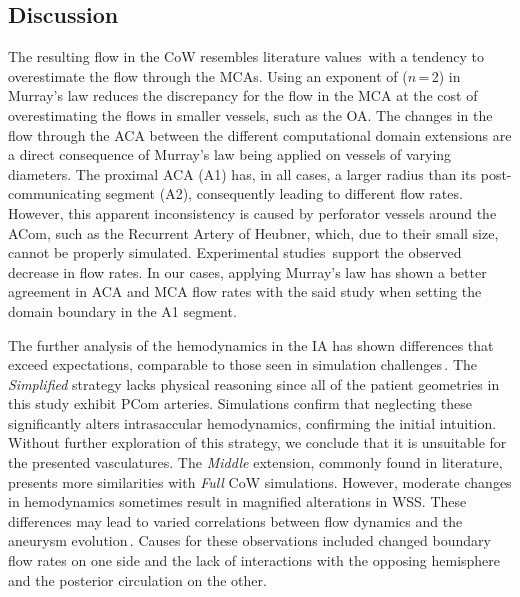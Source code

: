 \subsection{Discussion}
The resulting flow in the CoW resembles literature values\,\cite{Zarrinkoob2015} with a tendency to overestimate the flow through the MCAs. Using an exponent of ($n$\,=\,2) in Murray's law reduces the discrepancy for the flow in the MCA at the cost of overestimating the flows in smaller vessels, such as the OA. The changes in the flow through the ACA between the different computational domain extensions are a direct consequence of Murray's law being applied on vessels of varying diameters. The proximal ACA (A1) has, in all cases, a larger radius than its post-communicating segment (A2), consequently leading to different flow rates. However, this apparent inconsistency is caused by perforator vessels around the ACom, such as the Recurrent Artery of Heubner, which, due to their small size, cannot be properly simulated. Experimental studies\,\cite{Zarrinkoob2015} support the observed decrease in flow rates. In our cases, applying Murray's law has shown a better agreement in ACA and MCA flow rates with the said study when setting the domain boundary in the A1 segment.

The further analysis of the hemodynamics in the IA has shown differences that exceed expectations, comparable to those seen in simulation challenges\,\cite{Berg2018, Berg2019, Valen-Sendstad2018}. The \textit{Simplified} strategy lacks physical reasoning since all of the patient geometries in this study exhibit PCom arteries. Simulations confirm that neglecting these significantly alters intrasaccular hemodynamics, confirming the initial intuition. Without further exploration of this strategy, we conclude that it is unsuitable for the presented vasculatures. The \textit{Middle} extension, commonly found in literature, presents more similarities with \textit{Full} CoW simulations. However, moderate changes in hemodynamics sometimes result in magnified alterations in WSS. These differences may lead to varied correlations between flow dynamics and the aneurysm evolution\,\cite{Valen-Sendstad2014}. Causes for these observations included changed boundary flow rates on one side and the lack of interactions with the opposing hemisphere and the posterior circulation on the other.

